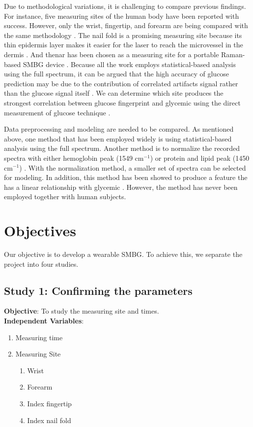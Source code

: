 Due to methodological variations, it is challenging to compare previous findings.
For instance, five measuring sites of the human body have been reported with success. 
However, only the wrist, fingertip, and forearm are being compared with the same methodology \citep{sitecompare}.
The nail fold is a promising measuring site because its thin epidermis layer makes it easier for the laser to reach the microvessel in the dermis \citep{ramanNailFold2019}.
And thenar has been chosen as a measuring site for a portable Raman-based SMBG device \citep{glucobeam}.
Because all the work employs statistical-based analysis using the full spectrum, it can be argued that the high accuracy of glucose prediction may be due to the contribution of correlated artifacts signal rather than the glucose signal itself \citep{directGlucose}.
We can determine which site produces the strongest correlation between glucose fingerprint and glycemic using the direct measurement of glucose technique \citep{directGlucose}.

Data preprocessing and modeling are needed to be compared. 
As mentioned above, one method that has been employed widely is using statistical-based analysis using the full spectrum.
Another method is to normalize the recorded spectra with either hemoglobin peak (1549 $\text{cm}^{-1}$) \citep{solutionGlucose} or protein and lipid peak (1450 $\text{cm}^{-1}$) \citep{directGlucose}.
With the normalization method, a smaller set of spectra can be selected for modeling.
In addition, this method has been showed to produce a feature the has a linear relationship with glycemic \citep{solutionGlucose,directGlucose}.
However, the method has never been employed together with human subjects.


\section{Objectives}

Our objective is to develop a wearable SMBG.
To achieve this, we separate the project into four studies.

\subsection{Study 1: Confirming the parameters}

\textbf{Objective}: To study the measuring site and times.\\
\textbf{Independent Variables}: 
\begin{enumerate}
    \item Measuring time
    \item Measuring Site
    \begin{enumerate}
        \item Wrist
        \item Forearm
        \item Index fingertip
        \item Index nail fold
    \end{enumerate}
\end{enumerate}

